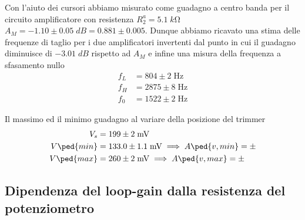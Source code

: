 \documentclass[10pt, a4paper, italian]{article}
\begin{document}
Con l'aiuto dei cursori abbiamo misurato come guadagno a centro banda
per il circuito amplificatore con resistenza $R_2^a = 5.1 \; \si{k\ohm}$
$A_M = -1.10 \pm 0.05 \; \si{dB} = 0.881 \pm 0.005$.
Dunque abbiamo ricavato una stima delle frequenze di taglio per i due
amplificatori invertenti dal punto in cui il guadagno diminuisce di
$-3.01 \; \si{dB}$ rispetto ad $A_M$ e infine una misura della frequenza a
sfasamento nullo
\begin{align*}
f_L &= 804 \pm 2 \; \si{\Hz} \\
f_H &= 2875 \pm 8 \; \si{\Hz} \\
f_0 &= 1522 \pm 2 \; \si{\Hz}
\end{align*}

Il massimo ed il minimo guadagno al variare della posizione del trimmer
\begin{align*}
V_s &= 199 \pm 2 \; \si{m\V} \\
V\ped{min} &= 133.0 \pm 1.1 \; \si{m\V} \implies  A\ped{v, min} = \pm \\
V\ped{max} &= 260 \pm 2 \; \si{m\V} \implies  A\ped{v, max} = \pm \\
\end{align*}

\subsection{Dipendenza del loop-gain dalla resistenza del potenziometro}
\end{document}
